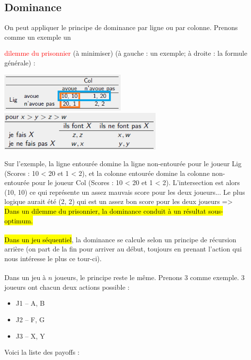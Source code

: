 \documentclass[a4paper, 12pt]{article}
\newcommand{\alinea}{
\hspace*{0.5cm}}
\newcommand{\red}[1]{
	\textcolor{red}{#1}}
\begin{document}
	\subsection{Dominance}
		\alinea On peut appliquer le principe de dominance par ligne ou par colonne. Prenons comme un exemple un 
			\red{dilemme du prisonnier} (à minimiser) (à gauche : un exemple; à droite : la formule générale) : 
		\begin{center}
			\includegraphics[width=2.5in]{Images/prisonnier} \hfill \includegraphics[width=3.25in]{Images/prisonnier2}
		\end{center}
		\alinea Sur l'exemple, la ligne entourée domine la ligne non-entourée pour le joueur Lig (Scores : 10 < 20 et 1 < 2),
			et la colonne entourée domine la colonne non-entourée pour le joueur Col (Scores : 10 < 20 et 1 < 2). L'intersection
			est alors (10, 10) ce qui représente un assez mauvais score pour les deux joueurs... Le plus logique aurait été
			(2, 2) qui est un assez bon score pour les deux joueurs => \hl{Dans un dilemme du prisonnier, la dominance conduit à un
			résultat sous-optimum.}\\
		~\\
		\alinea \hl{Dans un jeu séquentiel}, la dominance se calcule selon un principe de récursion arrière (on part de la fin pour arriver
			au début, toujours en prenant l'action qui nous intéresse le plus ce tour-ci).\\
		~\\
		\alinea Dans un jeu à $n$ joueurs, le principe reste le même. Prenons 3 comme exemple. 3 joueurs ont chacun deux actions 
			possible : 
			\begin{itemize}
				\setlength\itemsep{0cm}
				\item J1 -- A, B
				\item J2 -- F, G
				\item J3 -- X, Y
			\end{itemize}
			Voici la liste des payoffs : 
\end{document}
